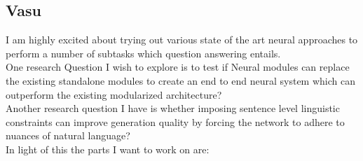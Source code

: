 \documentclass{article}
\begin{document}
\subsection{Vasu}
I am highly excited about trying out various state of the art neural approaches to perform a number of subtasks which question answering entails.\\
One research Question I wish to explore is to test if Neural modules can replace the existing standalone modules to create an end to end neural system which can outperform the existing modularized architecture?\\
Another research question I have is whether imposing sentence level linguistic constraints can improve generation quality by forcing the network to adhere to nuances of natural language?\\
In light of this the parts I want to work on are:\\
\end{document}

